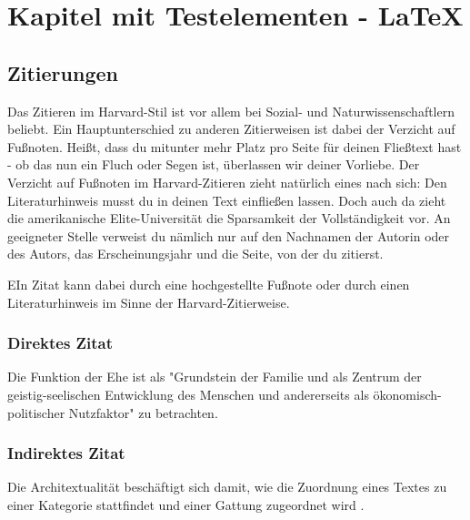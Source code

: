 \chapter{Kapitel mit Testelementen - LaTeX}                                         %
\section{Zitierungen}                                                               %
Das Zitieren im Harvard-Stil ist vor allem bei Sozial- und
Naturwissenschaftlern beliebt. Ein Hauptunterschied zu anderen Zitierweisen
ist dabei der Verzicht auf Fu\ss noten. Hei\ss t, dass du mitunter mehr Platz
pro Seite für deinen Flie\ss text hast - ob das nun ein Fluch oder Segen ist,
\"uberlassen wir deiner Vorliebe. Der Verzicht auf Fu\ss noten im
Harvard-Zitieren zieht nat\"urlich eines nach sich: Den Literaturhinweis
musst du in deinen Text einflie\ss en lassen. Doch auch da zieht die
amerikanische Elite-Universit\"at die Sparsamkeit der Vollst\"andigkeit vor.
An geeigneter Stelle verweist du n\"amlich nur auf den Nachnamen der Autorin
oder des Autors, das Erscheinungsjahr und die Seite, von der du zitierst.\par

EIn Zitat kann dabei durch eine hochgestellte Fu\ss note
 oder durch einen Literaturhinweis im Sinne der
Harvard-Zitierweise.                                                                %

\subsection{Direktes Zitat}                                                         %
Die Funktion der Ehe ist als
"Grundstein der Familie und als Zentrum der geistig-seelischen Entwicklung des
Menschen und andererseits als \"okonomisch-politischer Nutzfaktor"
\autocite{aristotle:physics} zu betrachten.                                         %

\subsection{Indirektes Zitat}
Die Architextualit\"at besch\"aftigt sich damit, wie die Zuordnung eines Textes
zu einer Kategorie stattfindet und einer Gattung zugeordnet wird
\autocite[9]{aristotle:physics}.                                                    %

